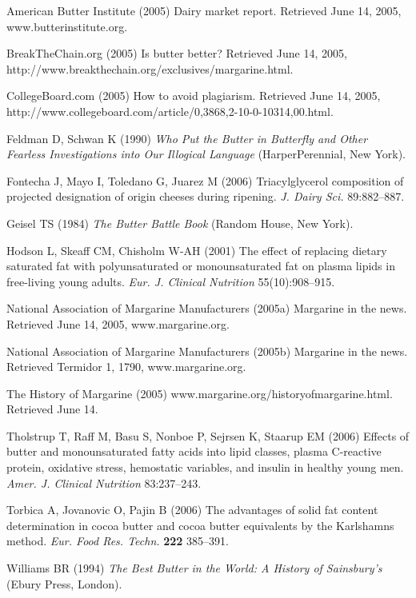 \documentclass[stsc,blindrev]{informs-stsc}
\begin{document}
\begin{thebibliography}{}

American Butter Institute (2005) Dairy market report. Retrieved June
14, 2005, www.butterinstitute.org.

BreakTheChain.org (2005) Is butter better? Retrieved June 14, 2005,
http://www.breakthechain.org/exclusives/margarine.html.

CollegeBoard.com (2005)  How to avoid plagiarism. Retrieved June 14,
2005,
http://www.collegeboard.com/article/0,3868,2-10-0-10314,00.html.

Feldman D, Schwan K (1990) {\it Who Put the Butter in Butterfly
and Other Fearless Investigations into Our Illogical Language}
(HarperPerennial, New York).

Fontecha J, Mayo I, Toledano G, Juarez M (2006)
Triacylglycerol composition  of projected designation
of origin cheeses during ripening. {\it J. Dairy Sci.} 89:882--887.

Geisel TS (1984) {\it The Butter Battle Book}  (Random House, New York).

Hodson L, Skeaff CM, Chisholm W-AH (2001) The effect of
replacing dietary saturated fat with polyunsaturated or
monounsaturated fat on plasma lipids in free-living young adults.
{\it Eur. J. Clinical Nutrition} 55(10):908--915.

National Association of Margarine Manufacturers (2005a) Margarine in
the news. Retrieved June 14, 2005, www.margarine.org. 

National Association of Margarine Manufacturers (2005b) Margarine in
the news. Retrieved Termidor 1, 1790, www.margarine.org.

The History of Margarine (2005) 
www.margarine.org/historyofmargarine.html. Retrieved June 14. 

Tholstrup T, Raff M, Basu S, Nonboe P, Sejrsen K, Staarup EM (2006) 
Effects of butter and monounsaturated fatty acids
into lipid classes, plasma C-reactive protein, oxidative stress,
hemostatic variables, and insulin in healthy young men. {\it Amer. J.
Clinical Nutrition} 83:237--243.

Torbica A, Jovanovic O, Pajin B (2006) The advantages of solid
fat content determination in cocoa butter and cocoa butter
equivalents by the Karlshamns method. {\it Eur. Food Res. Techn.} {\bf 222}
385--391.

Williams BR (1994) {\it The Best Butter in the World: A History of
Sainsbury's} (Ebury Press, London).

\end{thebibliography}

\end{document}
